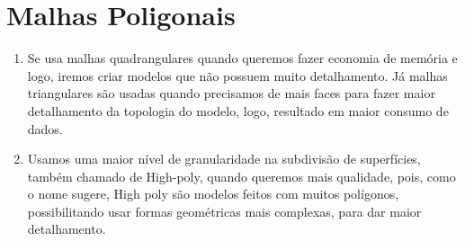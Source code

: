 \section*{Malhas Poligonais}

	\begin{enumerate}\addtocounter{enumi}{7}
	
		\item Se usa malhas quadrangulares quando queremos fazer economia de memória e 
		logo, iremos criar modelos que não possuem muito detalhamento. Já malhas triangulares
		são usadas quando precisamos de mais faces para fazer maior detalhamento da topologia
		do modelo, logo, resultado em maior consumo de dados.
		
		\item Usamos uma maior nível de granularidade na subdivisão de superfícies, também 
		chamado de High-poly, quando queremos mais qualidade, pois, como o nome sugere, High 
		poly são modelos feitos com muitos polígonos, possibilitando usar formas geométricas mais 
		complexas, para dar maior detalhamento.
		
	\end{enumerate}